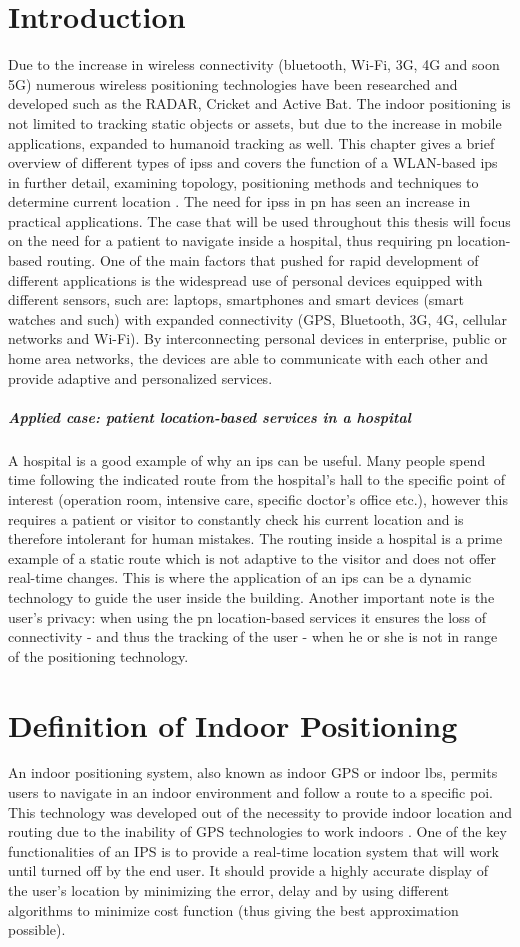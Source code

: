 \section{Introduction}
Due to the increase in wireless connectivity (bluetooth, Wi-Fi, 3G, 4G and soon 5G) numerous wireless positioning technologies have been researched and developed such as the RADAR, Cricket and Active Bat. The indoor positioning is not limited to tracking static objects or assets, but due to the increase in mobile applications, expanded to humanoid tracking as well. This chapter gives a brief overview of different types of \acrfull{ips}s and covers the function of a WLAN-based \acrshort{ips} in further detail, examining topology, positioning methods and techniques to determine current location \cite{Sakpere2017}. The need for \acrshort{ips}s in \acrfull{pn} has seen an increase in practical applications. The case that will be used throughout this thesis will focus on the need for a patient to navigate inside a hospital, thus requiring \acrshort{pn} location-based routing. One of the main factors that pushed for rapid development of different applications is the widespread use of personal devices equipped with different sensors, such are: laptops, smartphones and smart devices (smart watches and such) with expanded connectivity (GPS, Bluetooth, 3G, 4G, cellular networks and Wi-Fi). By interconnecting personal devices in enterprise, public or home area networks, the devices are able to communicate with each other and provide adaptive and personalized services. 
\subparagraph{Applied case: patient location-based services in a hospital}
A hospital is a good example of why an \acrshort{ips} can be useful. Many people spend time following the indicated route from the hospital's hall to the specific point of interest (operation room, intensive care, specific doctor's office etc.), however this requires a patient or visitor to constantly check his current location and is therefore intolerant for human mistakes. The routing inside a hospital is a prime example of a static route which is not adaptive to the visitor and does not offer real-time changes. This is where the application of an \acrshort{ips} can be a dynamic technology to guide the user inside the building. Another important note is the user's privacy: when using the \acrshort{pn} location-based services it ensures the loss of connectivity - and thus the tracking of the user - when he or she is not in range of the positioning technology.
\section{Definition of Indoor Positioning}
An indoor positioning system, also known as indoor GPS or indoor \acrfull{lbs}, permits users to navigate in an indoor environment and follow a route to a specific \acrfull{poi}. This technology was developed out of the necessity to provide indoor location and routing due to the inability of GPS technologies to work indoors \cite{Indoors2019}. One of the key functionalities of an IPS is to provide a real-time location system that will work until turned off by the end user. It should provide a highly accurate display of the user's location by minimizing the error, delay and by using different algorithms to minimize cost function (thus giving the best approximation possible). 
